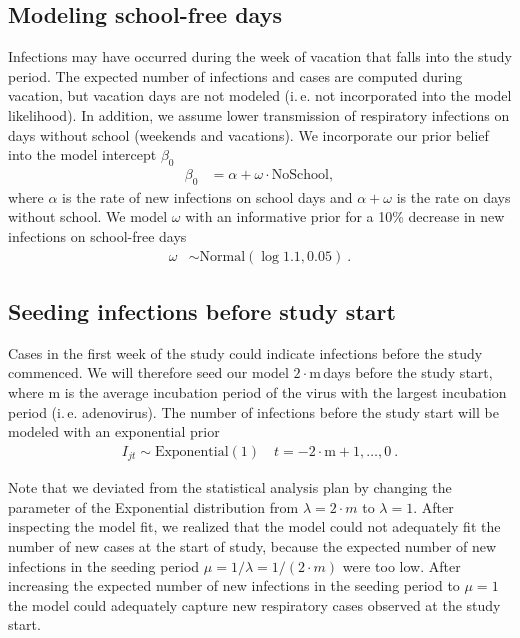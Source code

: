 \documentclass[fleqn,11pt]{wlscirep_supp}
\newcommand\ie{i.\,e.\xspace}
\begin{document}
\subsection{Modeling school-free days}

Infections may have occurred during the week of vacation that falls into the study period. The expected number of infections and cases are computed during vacation, but vacation days are not modeled (\ie not incorporated into the model likelihood). In addition, we assume lower transmission of respiratory infections on days without school (weekends and vacations). We incorporate our prior belief into the model intercept $\beta_0$  
\begin{align*}
    \beta_0 &= \alpha + \omega \cdot \text{NoSchool},
\end{align*}
where $\alpha$ is the rate of new infections on school days and $\alpha + \omega$ is the rate on days without school. We model $\omega$ with an informative prior for a 10\% decrease in new infections on school-free days
\begin{align*}
    \omega &\sim \text{Normal}(\log 1.1, 0.05)~.
\end{align*}

\subsection{Seeding infections before study start}

Cases in the first week of the study could indicate infections before the study commenced. We will therefore seed our model $2 \cdot \text{m}\,$days before the study start, where $\text{m}$ is the average incubation period of the virus with the largest incubation period (\ie adenovirus). The number of infections before the study start will be modeled with an exponential prior
\begin{align*}
    I_{jt} \sim \text{Exponential}(1) \quad t = -2\cdot\text{m}+1, \dots, 0~. 
\end{align*}

Note that we deviated from the statistical analysis plan by changing the parameter of the Exponential distribution from $\lambda = 2 \cdot m$ to $\lambda = 1$. After inspecting the model fit, we realized that the model could not adequately fit the number of new cases at the start of study, because the expected number of new infections in the seeding period $\mu = 1 / \lambda = 1 / (2 \cdot m)$ were too low. After increasing the expected number of new infections in the seeding period to $\mu = 1$ the model could adequately capture new respiratory cases observed at the study start.
\end{document}
